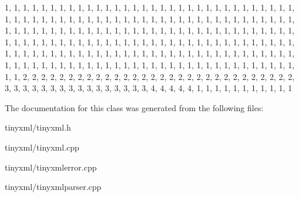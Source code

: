 \begin{DoxyCode}
 
{
        
                1,      1,      1,      1,      1,      1,      1,      1,      
      1,       1,      1,      1,      1,      1,      1,      1,      
                1,      1,      1,      1,      1,      1,      1,      1,      
      1,       1,      1,      1,      1,      1,      1,      1,      
                1,      1,      1,      1,      1,      1,      1,      1,      
      1,       1,      1,      1,      1,      1,      1,      1,      
                1,      1,      1,      1,      1,      1,      1,      1,      
      1,       1,      1,      1,      1,      1,      1,      1,      
                1,      1,      1,      1,      1,      1,      1,      1,      
      1,       1,      1,      1,      1,      1,      1,      1,      
                1,      1,      1,      1,      1,      1,      1,      1,      
      1,       1,      1,      1,      1,      1,      1,      1,      
                1,      1,      1,      1,      1,      1,      1,      1,      
      1,       1,      1,      1,      1,      1,      1,      1,      
                1,      1,      1,      1,      1,      1,      1,      1,      
      1,       1,      1,      1,      1,      1,      1,      1,      
                1,      1,      1,      1,      1,      1,      1,      1,      
      1,       1,      1,      1,      1,      1,      1,      1,      
                1,      1,      1,      1,      1,      1,      1,      1,      
      1,       1,      1,      1,      1,      1,      1,      1,      
                1,      1,      1,      1,      1,      1,      1,      1,      
      1,       1,      1,      1,      1,      1,      1,      1,      
                1,      1,      1,      1,      1,      1,      1,      1,      
      1,       1,      1,      1,      1,      1,      1,      1,      
                1,      1,      2,      2,      2,      2,      2,      2,      
      2,       2,      2,      2,      2,      2,      2,      2,      
                2,      2,      2,      2,      2,      2,      2,      2,      
      2,       2,      2,      2,      2,      2,      2,      2,      
                3,      3,      3,      3,      3,      3,      3,      3,      
      3,       3,      3,      3,      3,      3,      3,      3,      
                4,      4,      4,      4,      4,      1,      1,      1,      
      1,       1,      1,      1,      1,      1,      1,      1       
}
\end{DoxyCode}


\-The documentation for this class was generated from the following files\-:\begin{DoxyCompactItemize}
\item 
tinyxml/tinyxml.\-h\item 
tinyxml/tinyxml.\-cpp\item 
tinyxml/tinyxmlerror.\-cpp\item 
tinyxml/tinyxmlparser.\-cpp\end{DoxyCompactItemize}
